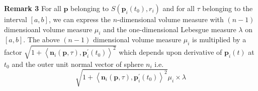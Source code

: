 \textbf{Remark 3}
For all $\mathbf{p}$ belonging to $S\left(\mathbf{p}_{i}\left(t_{0}\right), r_{i}\right)$ and for all $\tau $ belonging to the interval $[a, b]$, we can express the $n$-dimensional volume measure  with $(n-1)$ dimensioanl volume measure $\mu_{i}$ and the one-dimensional Lebesgue measure $\lambda$ on $[a, b]$. The above $(n-1)$ dimensional volume measure $\mu_{i}$ is multiplied by a factor $\sqrt{1+\left\langle\mathbf{n}_{i}(\mathbf{p}, \tau), \mathbf{p}_{i}^{\prime}\left(t_{0}\right)\right\rangle^{2}}$ which depends upon derivative of $\mathbf{p}_i(t)$ at $t_0$ and the outer unit normal vector of sphere $n_i$
i.e.
$$
\sqrt{1+\left\langle\mathbf{n}_{i}(\mathbf{p}, \tau), \mathbf{p}_{i}^{\prime}\left(t_{0}\right)\right\rangle^{2}} \mu_{i} \times \lambda
$$



























